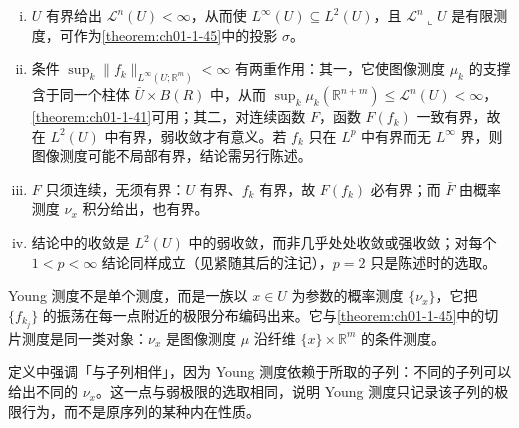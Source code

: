 \documentclass[../../main.tex]{subfiles}%
\begin{document}
\begin{remark}\label{remark:ch01-def-1-34-条件}
\begin{enumerate}[(i)]
\item $U$ 有界给出 $\mathcal{L}^n(U)<\infty$，从而使 $L^\infty(U)\subseteq L^2(U)$，且 $\mathcal{L}^n\llcorner U$ 是有限测度，可作为\cref{theorem:ch01-1-45}中的投影 $\sigma$。%
\item 条件 $\sup_k\lVert f_k\rVert_{L^\infty(U;\mathbb{R}^m)}<\infty$ 有两重作用：其一，它使图像测度 $\mu_k$ 的支撑含于同一个柱体 $\bar U\times B(R)$ 中，从而 $\sup_k\mu_k(\mathbb{R}^{n+m})\leqslant\mathcal{L}^n(U)<\infty$，\cref{theorem:ch01-1-41}可用；其二，对连续函数 $F$，函数 $F(f_k)$ 一致有界，故在 $L^2(U)$ 中有界，弱收敛才有意义。若 $f_k$ 只在 $L^p$ 中有界而无 $L^\infty$ 界，则图像测度可能不局部有界，结论需另行陈述。%
\item $F$ 只须连续，无须有界：$U$ 有界、$f_k$ 有界，故 $F(f_k)$ 必有界；而 $\bar F$ 由概率测度 $\nu_x$ 积分给出，也有界。
\item 结论中的收敛是 $L^2(U)$ 中的弱收敛，而非几乎处处收敛或强收敛；对每个 $1<p<\infty$ 结论同样成立（见紧随其后的注记），$p=2$ 只是陈述时的选取。
\end{enumerate}
\end{remark}

\begin{remark}\label{remark:ch01-def-1-34-b}
Young 测度不是单个测度，而是一族以 $x\in U$ 为参数的概率测度 $\{\nu_x\}$，它把 $\{f_{k_j}\}$ 的振荡在每一点附近的极限分布编码出来。它与\cref{theorem:ch01-1-45}中的切片测度是同一类对象：$\nu_x$ 是图像测度 $\mu$ 沿纤维 $\{x\}\times\mathbb{R}^m$ 的条件测度。%

定义中强调「与子列相伴」，因为 Young 测度依赖于所取的子列：不同的子列可以给出不同的 $\nu_x$。这一点与弱极限的选取相同，说明 Young 测度只记录该子列的极限行为，而不是原序列的某种内在性质。
\end{remark}
\end{document}
